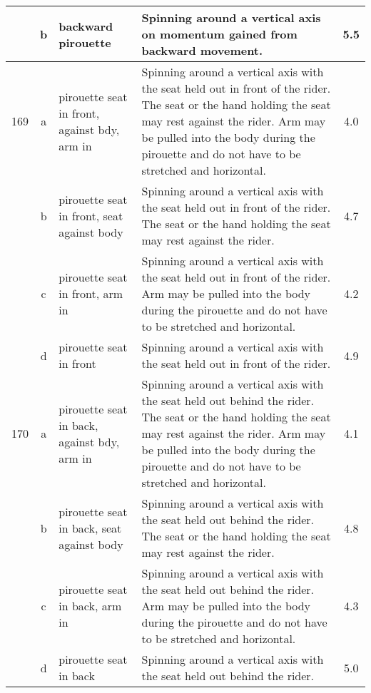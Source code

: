 \begin{longtable}{|r|c|p{4cm}|p{8cm}|c|}
\hline
  & b & backward pirouette  & Spinning around a vertical axis on momentum gained from backward movement.  & 5.5 \\ 
\hline
169 & a & pirouette seat in front, against bdy, arm in  & Spinning around a vertical axis with the seat held out in front of the rider. The seat or the hand holding the seat may rest against the rider. Arm may be pulled into the body during the pirouette and do not have to be stretched and horizontal.  & 4.0 \\ 
\hline
  & b & pirouette seat in front, seat against body  & Spinning around a vertical axis with the seat held out in front of the rider. The seat or the hand holding the seat may rest against the rider. & 4.7 \\ 
\hline
  & c & pirouette seat in front, arm in & Spinning around a vertical axis with the seat held out in front of the rider. Arm may be pulled into the body during the pirouette and do not have to be stretched and horizontal.  & 4.2 \\ 
\hline
  & d & pirouette seat in front & Spinning around a vertical axis with the seat held out in front of the rider. & 4.9 \\ 
\hline
170 & a & pirouette seat in back, against bdy, arm in & Spinning around a vertical axis with the seat held out behind the rider. The seat or the hand holding the seat may rest against the rider. Arm may be pulled into the body during the pirouette and do not have to be stretched and horizontal. & 4.1 \\ 
\hline
  & b & pirouette seat in back, seat against body & Spinning around a vertical axis with the seat held out behind the rider. The seat or the hand holding the seat may rest against the rider.  & 4.8 \\ 
\hline
  & c & pirouette seat in back, arm in  & Spinning around a vertical axis with the seat held out behind the rider. Arm may be pulled into the body during the pirouette and do not have to be stretched and horizontal. & 4.3 \\ 
\hline
  & d & pirouette seat in back  & Spinning around a vertical axis with the seat held out behind the rider.  & 5.0 \\ 
\hline
\end{longtable}
\newpage

